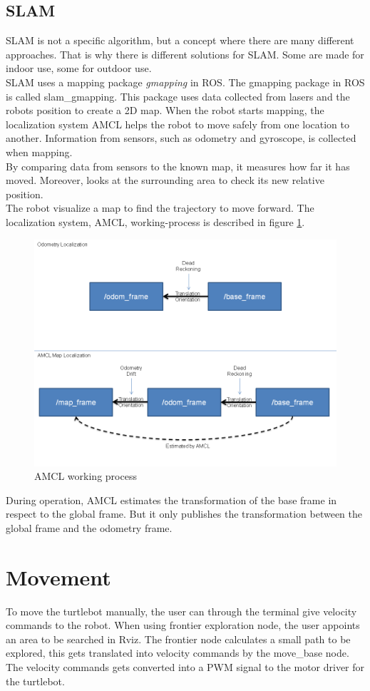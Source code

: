 \subsection{SLAM}
SLAM is not a specific algorithm, but a concept where there are many different approaches. That is why there is different solutions for SLAM. Some are made for indoor use, some for outdoor use.\\
SLAM uses a mapping package \textit{gmapping} in ROS. The gmapping package in ROS is called slam\_gmapping. This package uses data collected from lasers and the robots position to create a 2D map. %
When the robot starts mapping, the localization system AMCL helps the robot to move safely from one location to another.
Information from sensors, such as odometry and gyroscope, is collected when mapping. \\
By comparing data from sensors to the known map, it measures how far it has moved. Moreover, looks at the surrounding area to check its new relative position.\\The robot visualize a map to find the trajectory to move forward. The localization system, AMCL, working-process is described in figure \ref{fig:amcl}.
\begin{figure}
    \centering
    \includegraphics[width=.7\textwidth]{figures/AMCL.png}
    \caption{AMCL working process\cite{AMCL}} 
    \label{fig:amcl} 
\end{figure}
 During operation, AMCL estimates the transformation of the base frame in respect to the global frame. But it only publishes the transformation between the global frame and the odometry frame\cite{AMCL}.

%
%
%
%

\section{Movement}
To move the turtlebot manually, the user can through the terminal give velocity commands to the robot. When using frontier exploration node, the user appoints an area to be searched in Rviz. The frontier node calculates a small path to be explored, this gets translated into velocity commands by the move\_base node. The velocity commands gets converted into a PWM signal to the motor driver for the turtlebot.

